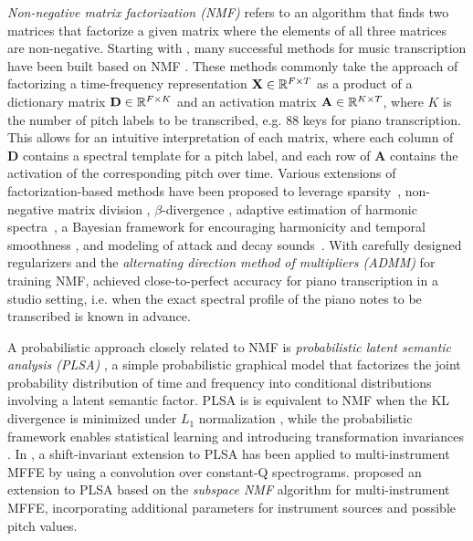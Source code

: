 \textit{Non-negative matrix factorization (NMF)} \cite{lee1999nmf,lee2001nmf} refers to an algorithm that finds two matrices that factorize a given matrix where the elements of all three matrices are non-negative.
Starting with , many successful methods for music transcription have been built based on NMF \cite{benetos2019amt}.
These methods commonly take the approach of factorizing a time-frequency representation $\mathbf{X} \in \mathbb{R}^{F \times T}$ as a product of a dictionary matrix $\mathbf{D} \in \mathbb{R}^{F \times K}$ and an activation matrix $\mathbf{A} \in \mathbb{R}^{K \times T}$, where $K$ is the number of pitch labels to be transcribed, e.g. 88 keys for piano transcription.
This allows for an intuitive interpretation of each matrix, where each column of $\mathbf{D}$ contains a spectral template for a pitch label, and each row of $\mathbf{A}$ contains the activation of the corresponding pitch over time.
Various extensions of factorization-based methods have been proposed to leverage sparsity~\cite{abdallah2004sparse,cont2006realtime,costantini2013nmf}, non-negative matrix division \cite{niedermayer2008division}, $\beta$-divergence \cite{dessein2010beta}, adaptive estimation of harmonic spectra~\cite{vincent2010adaptive,fuentes2013harmonic}, a Bayesian framework for encouraging harmonicity and temporal smoothness \cite{bertin2009nmf,bertin2010nmf,peeling2010factorization}, and modeling of attack and decay sounds~\cite{benetos2013multi,ewert2016admm}.
With carefully designed regularizers and the \textit{alternating direction method of multipliers (ADMM)} for training NMF,  achieved close-to-perfect accuracy for piano transcription in a studio setting, i.e. when the exact spectral profile of the piano notes to be transcribed is known in advance.

  


A probabilistic approach closely related to NMF is \textit{probabilistic latent semantic analysis (PLSA)} \cite{hofmann1999plsa}, a simple probabilistic graphical model that factorizes the joint probability distribution of time and frequency into conditional distributions involving a latent semantic factor.
PLSA is is equivalent to NMF when the KL divergence is minimized under $L_1$ normalization \cite{gaussier2005plsa,ding2008equiv}, while the probabilistic framework enables statistical learning and introducing transformation invariances \cite{smaragdis2006latent}.
In \cite{smaragdis2009relative,benetos2012latent}, a shift-invariant extension to PLSA has been applied to multi-instrument MFFE by using a convolution over constant-Q spectrograms.
 proposed an extension to PLSA based on the \textit{subspace NMF} algorithm \cite{grindlay2009eigeninstruments} for multi-instrument MFFE, incorporating additional parameters for instrument sources and possible pitch values.



